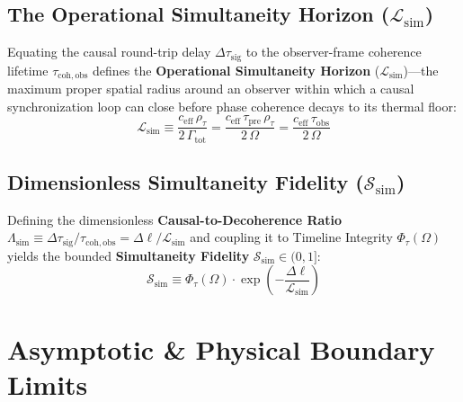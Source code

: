 \documentclass[11pt,a4paper]{article}
\begin{document}
\subsection{The Operational Simultaneity Horizon ($\mathcal{L}_{\mathrm{sim}}$)}
Equating the causal round-trip delay $\Delta \tau_{\mathrm{sig}}$ to the observer-frame coherence lifetime $\tau_{\mathrm{coh, obs}}$ defines the \textbf{Operational Simultaneity Horizon} ($\mathcal{L}_{\mathrm{sim}}$)---the maximum proper spatial radius around an observer within which a causal synchronization loop can close before phase coherence decays to its thermal floor:
\begin{equation}
    \mathcal{L}_{\mathrm{sim}} \equiv \frac{c_{\mathrm{eff}}\,\rho_\tau}{2\,\Gamma_{\mathrm{tot}}} = \frac{c_{\mathrm{eff}}\,\tau_{\mathrm{pre}}\,\rho_\tau}{2\,\Omega} = \frac{c_{\mathrm{eff}}\,\tau_{\mathrm{obs}}}{2\,\Omega}
\end{equation}

\subsection{Dimensionless Simultaneity Fidelity ($\mathcal{S}_{\mathrm{sim}}$)}
Defining the dimensionless \textbf{Causal-to-Decoherence Ratio} $\Lambda_{\mathrm{sim}} \equiv \Delta \tau_{\mathrm{sig}} / \tau_{\mathrm{coh, obs}} = \Delta \ell / \mathcal{L}_{\mathrm{sim}}$ and coupling it to Timeline Integrity $\Phi_\tau(\Omega)$ yields the bounded \textbf{Simultaneity Fidelity} $\mathcal{S}_{\mathrm{sim}} \in (0, 1]$:
\begin{equation}
    \mathcal{S}_{\mathrm{sim}} \equiv \Phi_\tau(\Omega) \cdot \exp\!\left(-\frac{\Delta \ell}{\mathcal{L}_{\mathrm{sim}}}\right)
\end{equation}

\section{Asymptotic \& Physical Boundary Limits}
\end{document}
